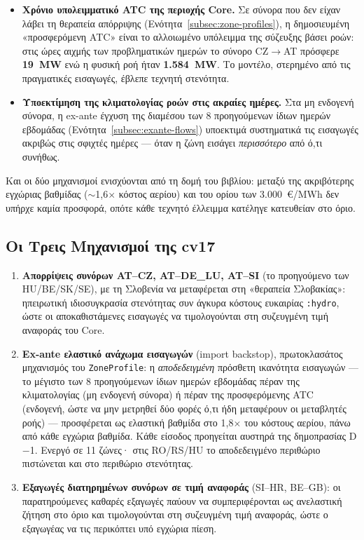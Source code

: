 \begin{itemize}
\item \textbf{Χρόνιο υπολειμματικό ATC της περιοχής Core.} Σε σύνορα που δεν είχαν λάβει τη θεραπεία απόρριψης (Ενότητα~\ref{subsec:zone-profiles}), η δημοσιευμένη «προσφερόμενη ATC» είναι το αλλοιωμένο υπόλειμμα της σύζευξης βάσει ροών: στις ώρες αιχμής των προβληματικών ημερών το σύνορο CZ$\to$AT πρόσφερε \textbf{19~MW} ενώ η φυσική ροή ήταν \textbf{1.584~MW}. Το μοντέλο, στερημένο από τις πραγματικές εισαγωγές, έβλεπε τεχνητή στενότητα.
\item \textbf{Υποεκτίμηση της κλιματολογίας ροών στις ακραίες ημέρες.} Στα μη ενδογενή σύνορα, η ex-ante έγχυση της διαμέσου των 8 προηγούμενων ίδιων ημερών εβδομάδας (Ενότητα~\ref{subsec:exante-flows}) υποεκτιμά συστηματικά τις εισαγωγές ακριβώς στις σφιχτές ημέρες --- όταν η ζώνη εισάγει \emph{περισσότερο} από ό,τι συνήθως.
\end{itemize}

Και οι δύο μηχανισμοί ενισχύονται από τη δομή του βιβλίου: μεταξύ της ακριβότερης εγχώριας βαθμίδας ($\sim$1,6$\times$ κόστος αερίου) και του ορίου των 3.000~€/MWh δεν υπήρχε καμία προσφορά, οπότε κάθε τεχνητό έλλειμμα κατέληγε κατευθείαν στο όριο.

\subsection{Οι Τρεις Μηχανισμοί της cv17}
\label{subsec:cv17-mechanisms}

\begin{enumerate}
\item \textbf{Απορρίψεις συνόρων AT--CZ, AT--DE\_LU, AT--SI} (το προηγούμενο των HU/BE/SK/SE), με τη Σλοβενία να μεταφέρεται στη «θεραπεία Σλοβακίας»: ηπειρωτική ιδιοσυγκρασία στενότητας συν άγκυρα κόστους ευκαιρίας \texttt{:hydro}, ώστε οι αποκαθιστάμενες εισαγωγές να τιμολογούνται στη συζευγμένη τιμή αναφοράς του Core.
\item \textbf{Ex-ante ελαστικό ανάχωμα εισαγωγών} (import backstop), πρωτοκλασάτος μηχανισμός του \texttt{ZoneProfile}: η \emph{αποδεδειγμένη} πρόσθετη ικανότητα εισαγωγών --- το μέγιστο των 8 προηγούμενων ίδιων ημερών εβδομάδας πέραν της κλιματολογίας (μη ενδογενή σύνορα) ή πέραν της προσφερόμενης ATC (ενδογενή, ώστε να μην μετρηθεί δύο φορές ό,τι ήδη μεταφέρουν οι μεταβλητές ροής) --- προσφέρεται ως ελαστική βαθμίδα στο 1,8$\times$ του κόστους αερίου, πάνω από κάθε εγχώρια βαθμίδα. Κάθε είσοδος προηγείται αυστηρά της δημοπρασίας D$-$1. Ενεργό σε 11 ζώνες· στις RO/RS/HU το αποδεδειγμένο περιθώριο πιστώνεται και στο περιθώριο στενότητας.
\item \textbf{Εξαγωγές διατηρημένων συνόρων σε τιμή αναφοράς} (SI--HR, BE--GB): οι παρατηρούμενες καθαρές εξαγωγές παύουν να συμπεριφέρονται ως ανελαστική ζήτηση στο όριο και τιμολογούνται στη συζευγμένη τιμή αναφοράς, ώστε ο εξαγωγέας να τις περικόπτει υπό εγχώρια πίεση.
\end{enumerate}

